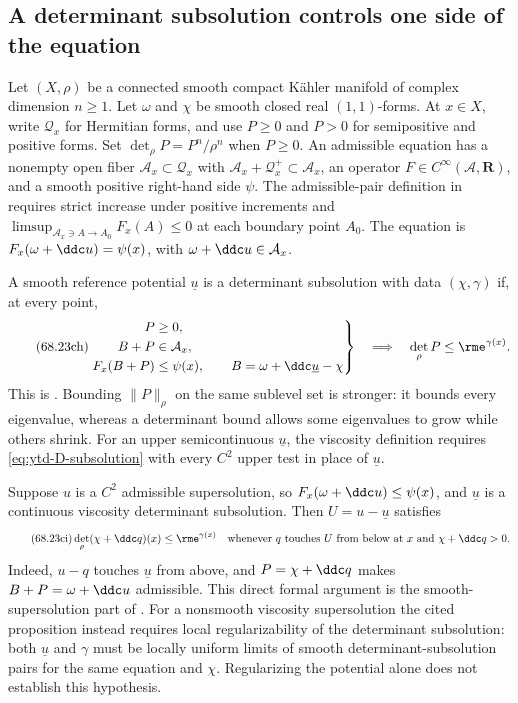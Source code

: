 \subsection{A determinant subsolution controls one side of the equation}
\label{sec:ytd-determinantal-subsolution}

Let $(X,\rho)$ be a connected smooth compact K\"ahler manifold of
complex dimension $n\geq1$. Let $\omega$ and $\chi$ be smooth closed
real $(1,1)$-forms. At $x\in X$, write $\mathcal Q_x$ for Hermitian
forms, and use $P\geq0$ and $P>0$ for semipositive and positive
forms. Set $\det_\rho P=P^n/\rho^n$ when $P\geq0$.
An admissible equation has a nonempty open fiber
$\mathcal A_x\subset\mathcal Q_x$ with
$\mathcal A_x+\mathcal Q_x^+\subset\mathcal A_x$, an operator
$F\in C^\infty(\mathcal A,\mathbf R)$, and a smooth positive right-hand side
$\psi$. The admissible-pair definition in
\cite[Definition~2.1]{FangMaWu26DeterminantalV1} requires strict
increase under positive increments and
$\limsup_{\mathcal A_x\ni A\to A_0}F_x(A)\leq0$ at each
boundary point $A_0$. The equation is
$F_x(\omega+\ddc u)=\psi(x)$, with $\omega+\ddc u\in\mathcal A_x$.

A smooth reference potential $\underline u$ is a determinant
subsolution with data $(\chi,\gamma)$ if, at every point,
\[
\tag{68.23ch}\label{eq:ytd-D-subsolution}
\left.
\begin{aligned}
 P&\geq0,\\
 B+P&\in\mathcal A_x,\\
 F_x(B+P)&\leq\psi(x),\qquad
 B=\omega+\ddc\underline u-\chi
\end{aligned}
\right\}
\quad\Longrightarrow\quad \det_\rho P\leq\rme^{\gamma(x)}.
\]
This is \cite[Definition~2.7]{FangMaWu26DeterminantalV1}.
Bounding $\|P\|_\rho$ on the same sublevel set is stronger:
it bounds every eigenvalue, whereas a determinant bound allows
some eigenvalues to grow while others shrink.
For an upper semicontinuous $\underline u$, the viscosity definition
requires \eqref{eq:ytd-D-subsolution} with every $C^2$ upper test
in place of $\underline u$.

Suppose $u$ is a $C^2$ admissible supersolution, so
$F_x(\omega+\ddc u)\leq\psi(x)$, and $\underline u$ is a continuous
viscosity determinant subsolution. Then $U=u-\underline u$ satisfies
\[
\tag{68.23ci}\label{eq:ytd-determinant-viscosity-bound}
 \det_\rho(\chi+\ddc q)(x)\leq\rme^{\gamma(x)}
 \quad\text{whenever }q\text{ touches }U\text{ from below at }x
 \text{ and }\chi+\ddc q>0.
\]
Indeed, $u-q$ touches $\underline u$ from above, and
$P=\chi+\ddc q$ makes $B+P=\omega+\ddc u$ admissible.
This direct formal argument is the smooth-supersolution part of
\cite[Proposition~3.2]{FangMaWu26DeterminantalV1}.
For a nonsmooth viscosity supersolution the cited proposition instead
requires local regularizability of the determinant subsolution:
both $\underline u$ and $\gamma$ must be locally uniform limits of
smooth determinant-subsolution pairs for the same equation and $\chi$.
Regularizing the potential alone does not establish this hypothesis.

